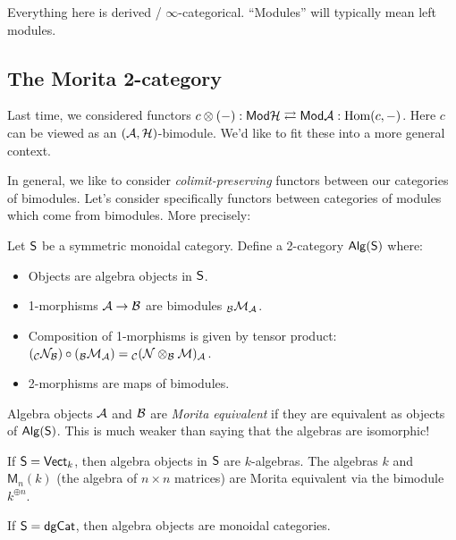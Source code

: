 \documentclass{article}
\begin{document}
Everything here is derived / $\infty$-categorical.
``Modules'' will typically mean left modules.

\subsection{The Morita 2-category}

Last time, we considered functors $c \otimes (-): \mathsf{Mod} \mathcal{H} \rightleftarrows \mathsf{Mod} \mathcal{A} : \operatorname{Hom}(c, -)$.
Here $c$ can be viewed as an $(\mathcal{A}, \mathcal{H})$-bimodule.
We'd like to fit these into a more general context.

In general, we like to consider \emph{colimit-preserving} functors between our categories of bimodules.
Let's consider specifically functors between categories of modules which come from bimodules.
More precisely:

\begin{dfn}
	Let $\mathsf{S}$ be a symmetric monoidal category.
	Define a 2-category $\mathsf{Alg}(\mathsf{S})$ where: 
	\begin{itemize}
		\item Objects are algebra objects in $\mathsf{S}$.
		\item 1-morphisms $\mathcal{A} \to \mathcal{B}$ are bimodules ${}_{\mathcal{B}} \mathcal{M}_{\mathcal{A}}$.
		\item Composition of 1-morphisms is given by tensor product: $({}_{\mathcal{C}} \mathcal{N}_{\mathcal{B}}) \circ ({}_{\mathcal{B}} \mathcal{M}_{\mathcal{A}}) = {}_{\mathcal{C}} (\mathcal{N} \otimes_{\mathcal{B}} \mathcal{M})_{\mathcal{A}}$.
		\item 2-morphisms are maps of bimodules.
	\end{itemize}
\end{dfn}

\begin{rmk}
	Algebra objects $\mathcal{A}$ and $\mathcal{B}$ are \emph{Morita equivalent} if they are equivalent as objects of $\mathsf{Alg}(\mathsf{S})$.
	This is much weaker than saying that the algebras are isomorphic!
\end{rmk}

\begin{ex}
	If $\mathsf{S} = \mathsf{Vect}_k$, then algebra objects in $\mathsf{S}$ are $k$-algebras.
	The algebras $k$ and $\mathsf{M}_n(k)$ (the algebra of $n \times n$ matrices) are Morita equivalent via the bimodule $k^{\oplus n}$.
\end{ex}

\begin{ex}
	If $\mathsf{S} = \mathsf{dgCat}$, then algebra objects are monoidal categories.
\end{ex}
\end{document}
